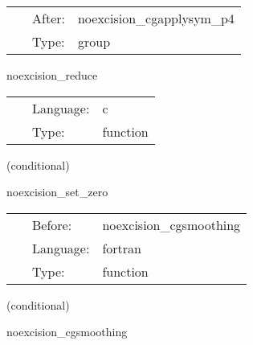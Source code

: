  \begin{tabular*}{160mm}{cll} 
~ & After:  & noexcision\_cgapplysym\_p4 \\ 
~ & Type:  & group \\ 
\end{tabular*} 


\vspace{5mm}


\hspace{5mm} noexcision\_reduce 

\hspace{5mm}{\it reduce rhs } 


\hspace{5mm}

 \begin{tabular*}{160mm}{cll} 
~ & Language:  & c \\ 
~ & Type:  & function \\ 
\end{tabular*} 


\vspace{5mm}

   (conditional) 

\hspace{5mm} noexcision\_set\_zero 

\hspace{5mm}{\it set variables to zero in user defined regions } 


\hspace{5mm}

 \begin{tabular*}{160mm}{cll} 
~ & Before:  & noexcision\_cgsmoothing \\ 
~ & Language:  & fortran \\ 
~ & Type:  & function \\ 
\end{tabular*} 


\vspace{5mm}

   (conditional) 

\hspace{5mm} noexcision\_cgsmoothing 

\hspace{5mm}{\it conjugate gradient smoothing } 


\hspace{5mm}

